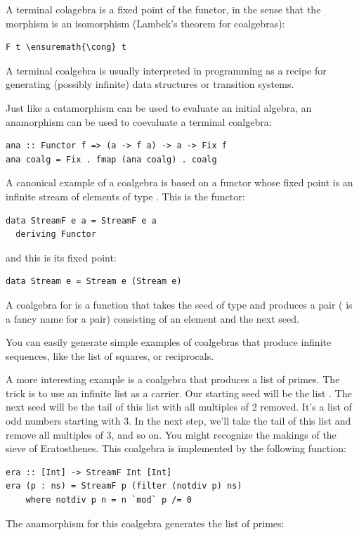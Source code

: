 \noindent
A terminal colagebra is a fixed point of the functor, in the sense that
the morphism  is an isomorphism
(Lambek's theorem for coalgebras):

\begin{Verbatim}[commandchars=\\\{\}]
F t \ensuremath{\cong} t
\end{Verbatim}
A terminal coalgebra is usually interpreted in programming as a recipe
for generating (possibly infinite) data structures or transition
systems.

Just like a catamorphism can be used to evaluate an initial algebra, an
anamorphism can be used to coevaluate a terminal coalgebra:

\begin{verbatim}
ana :: Functor f => (a -> f a) -> a -> Fix f
ana coalg = Fix . fmap (ana coalg) . coalg
\end{verbatim}
A canonical example of a coalgebra is based on a functor whose fixed
point is an infinite stream of elements of type . This is the
functor:

\begin{verbatim}
data StreamF e a = StreamF e a
  deriving Functor
\end{verbatim}
and this is its fixed point:

\begin{verbatim}
data Stream e = Stream e (Stream e)
\end{verbatim}
A coalgebra for  is a function that takes the seed of
type  and produces a pair ( is a fancy name
for a pair) consisting of an element and the next seed.

You can easily generate simple examples of coalgebras that produce
infinite sequences, like the list of squares, or reciprocals.

A more interesting example is a coalgebra that produces a list of
primes. The trick is to use an infinite list as a carrier. Our starting
seed will be the list \code{{[}2..{]}}. The next seed will be the tail
of this list with all multiples of 2 removed. It's a list of odd numbers
starting with 3. In the next step, we'll take the tail of this list and
remove all multiples of 3, and so on. You might recognize the makings of
the sieve of Eratosthenes. This coalgebra is implemented by the
following function:

\begin{verbatim}
era :: [Int] -> StreamF Int [Int]
era (p : ns) = StreamF p (filter (notdiv p) ns)
    where notdiv p n = n `mod` p /= 0
\end{verbatim}
The anamorphism for this coalgebra generates the list of primes:


